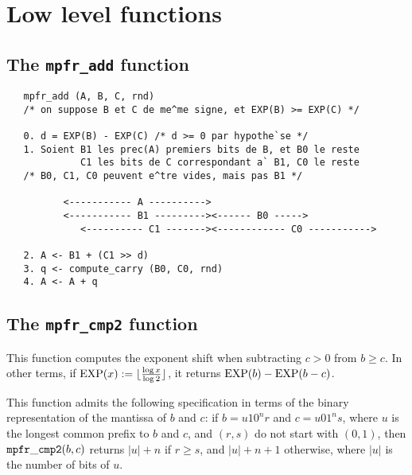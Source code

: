 \documentclass[12pt]{amsart}
\begin{document}
\section{Low level functions}

\subsection{The {\tt mpfr\_add} function}

\begin{verbatim}
   mpfr_add (A, B, C, rnd)
   /* on suppose B et C de me^me signe, et EXP(B) >= EXP(C) */

   0. d = EXP(B) - EXP(C) /* d >= 0 par hypothe`se */
   1. Soient B1 les prec(A) premiers bits de B, et B0 le reste
             C1 les bits de C correspondant a` B1, C0 le reste
   /* B0, C1, C0 peuvent e^tre vides, mais pas B1 */

          <----------- A ---------->
          <----------- B1 ---------><------ B0 ----->
             <---------- C1 -------><------------ C0 ----------->

   2. A <- B1 + (C1 >> d)
   3. q <- compute_carry (B0, C0, rnd)
   4. A <- A + q
\end{verbatim}

\subsection{The {\tt mpfr\_cmp2} function}

This function computes the exponent shift when subtracting $c > 0$ from
$b \ge c$. In other terms, if ${\rm EXP}(x) := 
\lfloor \frac{\log x}{\log 2} \rfloor$,
it returns ${\rm EXP}(b) - {\rm EXP}(b-c)$.

This function admits the following specification in terms of the binary
representation of the mantissa of $b$ and $c$: if $b = u 1 0^n r$ and
$c = u 0 1^n s$, where $u$ is the longest common prefix to $b$ and $c$,
and $(r,s)$ do not start with $(0, 1)$, then ${\tt mpfr\_cmp2}(b,c)$ returns
$|u| + n$ if $r \ge s$, and $|u| + n + 1$ otherwise, where $|u|$ is the number
of bits of $u$.
\end{document}
